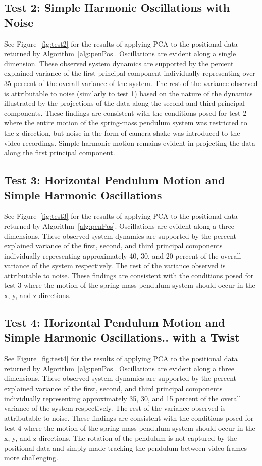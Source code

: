 \documentclass{article}
\begin{document}
\subsection{Test 2: Simple Harmonic Oscillations with Noise}
See Figure~\ref{fig:test2} for the results of applying PCA to the positional data returned by Algorithm~\ref{alg:penPos}. Oscillations are evident along a single dimension. These observed system dynamics are supported by the percent explained variance of the first principal component individually representing over 35 percent of the overall variance of the system. The rest of the variance observed is attributable to noise (similarly to test 1) based on the nature of the dynamics illustrated by the projections of the data along the second and third principal components. These findings are consistent with the conditions posed for test 2 where the entire motion of the spring-mass pendulum system was restricted to the z direction, but noise in the form of camera shake was introduced to the video recordings. Simple harmonic motion remains evident in projecting the data along the first principal component.

\subsection{Test 3: Horizontal Pendulum Motion and Simple Harmonic
Oscillations}
See Figure~\ref{fig:test3} for the results of applying PCA to the positional data returned by Algorithm~\ref{alg:penPos}. Oscillations are evident along a three dimensions. These observed system dynamics are supported by the percent explained variance of the first, second, and third principal components individually representing approximately 40, 30, and 20 percent of the overall variance of the system respectively. The rest of the variance observed is attributable to noise. These findings are consistent with the conditions posed for test 3 where the motion of the spring-mass pendulum system should occur in the x, y, and  z directions.

\subsection{Test 4: Horizontal Pendulum Motion and Simple Harmonic
Oscillations.. with a Twist}
See Figure~\ref{fig:test4} for the results of applying PCA to the positional data returned by Algorithm~\ref{alg:penPos}. Oscillations are evident along a three dimensions. These observed system dynamics are supported by the percent explained variance of the first, second, and third principal components individually representing approximately 35, 30, and 15 percent of the overall variance of the system respectively. The rest of the variance observed is attributable to noise. These findings are consistent with the conditions posed for test 4 where the motion of the spring-mass pendulum system should occur in the x, y, and  z directions. The rotation of the pendulum is not captured by the positional data and simply made tracking the pendulum between video frames more challenging.
\end{document}
